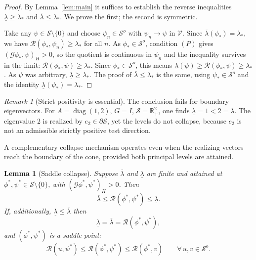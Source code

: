 \documentclass[preprint,10pt]{elsarticle}
\theoremstyle{plain}
\newtheorem{lemma}{Lemma}
\theoremstyle{definition}
\theoremstyle{remark}
\newtheorem{remark}{Remark}
\begin{document}
\begin{proof}
	By Lemma~\ref{lem:main} it suffices to establish the reverse inequalities
	$\underline{\lambda}\geq\lambda_{*}$ and $\overline{\lambda}\leq\lambda_{*}$.
	We prove the first; the second is symmetric.
	
	Take any $\psi\in\mathcal{S}\setminus\{0\}$ and choose
	$\psi_{n}\in\mathcal{S}^{o}$ with $\psi_{n}\to\psi$ in $\mathcal{V}$.
	Since $\overline{\lambda}(\phi_{*})=\lambda_{*}$, we have
	$\mathcal{R}(\phi_{*},\psi_{n})\geq\lambda_{*}$ for all $n$. As
	$\phi_{*}\in\mathcal{S}^{o}$, condition $(P)$ gives
	$(\mathcal{G}\phi_{*},\psi)_{H}>0$, so the quotient is continuous in
	$\psi_{n}$ and the inequality survives in the limit:
	$\mathcal{R}(\phi_{*},\psi)\geq\lambda_{*}$. Since
	$\phi_{*}\in\mathcal{S}^{o}$, this means
	$\underline{\lambda}(\psi)\geq\mathcal{R}(\phi_{*},\psi)\geq\lambda_{*}$.
	As $\psi$ was arbitrary, $\underline{\lambda}\geq\lambda_{*}$.
	The proof of $\overline{\lambda}\le\lambda_{*}$ is the same, using
	$\psi_{*}\in\mathcal S^o$ and the identity
	$\underline{\lambda}(\psi_{*})=\lambda_{*}$.
\end{proof}

\begin{remark}[Strict positivity is essential]
	The conclusion fails for boundary eigenvectors. For
	$A=\operatorname{diag}(1,2)$, $G=I$, $\mathcal{S}=\mathbb{R}_{+}^{2}$, one
	finds $\underline{\lambda}=1<2=\overline{\lambda}$. The eigenvalue $2$ is
	realized by $e_{2}\in\partial\mathcal{S}$, yet the levels do not collapse,
	because $e_{2}$ is not an admissible strictly positive test direction.
\end{remark}

A complementary collapse mechanism operates even when the realizing vectors
reach the boundary of the cone, provided both principal levels are attained.

\begin{lemma}[Saddle collapse]\label{lem:saddle-collapse}
	Suppose $\overline{\lambda}$ and $\underline{\lambda}$ are finite and attained
	at $\phi^{*},\psi^{*}\in\mathcal{S}\setminus\{0\}$, with
	$(\mathcal{G}\phi^{*},\psi^{*})_{H}>0$. Then
	\[
	\overline{\lambda}
	\leq \mathcal{R}(\phi^{*},\psi^{*})
	\leq \underline{\lambda}.
	\]
	If, additionally, $\underline{\lambda}\leq\overline{\lambda}$ then
	\[
	\underline{\lambda}
	= \overline{\lambda}
	= \mathcal{R}(\phi^{*},\psi^{*}),
	\]
	and $(\phi^{*},\psi^{*})$ is a saddle point:
	\[
	\mathcal{R}(u,\psi^{*})
	\leq \mathcal{R}(\phi^{*},\psi^{*}) \leq
	\mathcal{R}(\phi^{*},v)
	\qquad \forall\,u,v\in\mathcal{S}^{o}.
	\]
\end{lemma}
\end{document}
